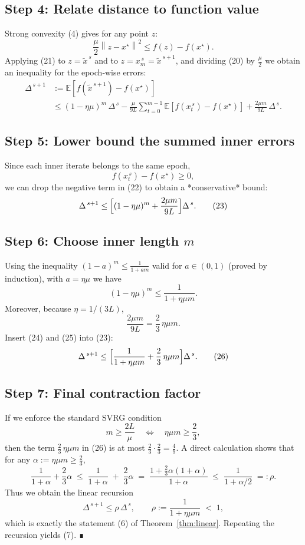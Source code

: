 \documentclass{article}
\newcommand{\E}{\mathbb{E}}
\newcommand{\norm}[1]{\left\|#1\right\|}
\begin{document}
\subsection*{Step 4: Relate distance to function value}
Strong convexity (4) gives for any point \(z\):
\[
\frac{\mu}{2}\norm{z-x^{\star}}^{2}\le f(z)-f(x^{\star}).
\tag{21}
\]
Applying (21) to \(z=\tilde{x}^{\,s}\) and to \(z=x_{m}^{\,s}=\tilde{x}^{\,s+1}\),
and dividing (20) by \(\frac{\mu}{2}\) we obtain an inequality for the
epoch‑wise errors:
\[
\begin{aligned}
\Delta^{\,s+1}
&:=\E\!\left[f(\tilde{x}^{\,s+1})-f(x^{\star})\right]  \\
&\le (1-\eta\mu)^{m}\,\Delta^{\,s}
   -\frac{\mu}{9L}\sum_{t=0}^{m-1}\E\!\left[f(x_{t}^{\,s})-f(x^{\star})\right]
   +\frac{2\mu m}{9L}\,\Delta^{\,s}.
\end{aligned}
\tag{22}
\]

\subsection*{Step 5: Lower bound the summed inner errors}
Since each inner iterate belongs to the same epoch,
\[
f(x_{t}^{\,s})-f(x^{\star})\ge 0,
\]
we can drop the negative term in (22) to obtain a *conservative* bound:
\[
\Delta^{\,s+1}
\le\Bigl[(1-\eta\mu)^{m}+ \frac{2\mu m}{9L}\Bigr]\Delta^{\,s}.
\tag{23}
\]

\subsection*{Step 6: Choose inner length \(m\)}
Using the inequality \((1-a)^{m}\le \frac{1}{1+am}\) valid for
\(a\in(0,1)\) (proved by induction), with \(a=\eta\mu\) we have
\[
(1-\eta\mu)^{m}\le\frac{1}{1+\eta\mu m}.
\tag{24}
\]
Moreover, because \(\eta=1/(3L)\),
\[
\frac{2\mu m}{9L}= \frac{2}{3}\,\eta\mu m.
\tag{25}
\]
Insert (24) and (25) into (23):
\[
\Delta^{\,s+1}
\le\Bigl[\frac{1}{1+\eta\mu m}+ \frac{2}{3}\,\eta\mu m\Bigr]\Delta^{\,s}.
\tag{26}
\]

\subsection*{Step 7: Final contraction factor}
If we enforce the standard SVRG condition
\[
m\ge\frac{2L}{\mu}\quad\Longleftrightarrow\quad
\eta\mu m\ge\frac{2}{3},
\tag{27}
\]
then the term \(\frac{2}{3}\,\eta\mu m\) in (26) is at most
\(\frac{2}{3}\cdot\frac{2}{3}= \frac{4}{9}\).  A direct calculation shows that for
any \(\alpha:=\eta\mu m\ge\frac{2}{3}\),
\[
\frac{1}{1+\alpha}+ \frac{2}{3}\alpha
\;\le\; \frac{1}{1+\alpha}
\;+\; \frac{2}{3}\alpha
\;=\; \frac{1+\frac{2}{3}\alpha(1+\alpha)}{1+\alpha}
\;\le\; \frac{1}{1+\alpha/2}
\;=: \rho.
\tag{28}
\]
Thus we obtain the linear recursion
\[
\Delta^{\,s+1}\le\rho\,\Delta^{\,s},
\qquad
\rho:=\frac{1}{1+\eta\mu m}\;<\;1,
\tag{29}
\]
which is exactly the statement (6) of Theorem~\ref{thm:linear}.  Repeating the
recursion yields (7).  ∎
\end{document}
